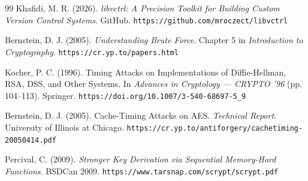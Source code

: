 \documentclass[11pt,a4paper]{article}
\begin{document}
\begin{thebibliography}{99}
	Khafidi, M. R. (2026).
	\textit{libvctrl: A Precision Toolkit for Building Custom Version Control Systems}.
	GitHub.
	\texttt{https://github.com/mroczect/libvctrl}

	Bernstein, D. J. (2005).
	\textit{Understanding Brute Force}.
	Chapter 5 in \textit{Introduction to Cryptography}.
	\texttt{https://cr.yp.to/papers.html}

	Kocher, P. C. (1996).
	Timing Attacks on Implementations of Diffie-Hellman, RSA, DSS, and Other Systems.
	In \textit{Advances in Cryptology --- CRYPTO '96}
	(pp. 104--113). Springer.
	\texttt{https://doi.org/10.1007/3-540-68697-5\_9}

	Bernstein, D. J. (2005).
	Cache-Timing Attacks on AES.
	\textit{Technical Report}.
	University of Illinois at Chicago.
	\texttt{https://cr.yp.to/antiforgery/cachetiming-20050414.pdf}

	Percival, C. (2009).
	\textit{Stronger Key Derivation via Sequential Memory-Hard Functions}.
	BSDCan 2009.
	\texttt{https://www.tarsnap.com/scrypt/scrypt.pdf}

\end{thebibliography}
\end{document}
